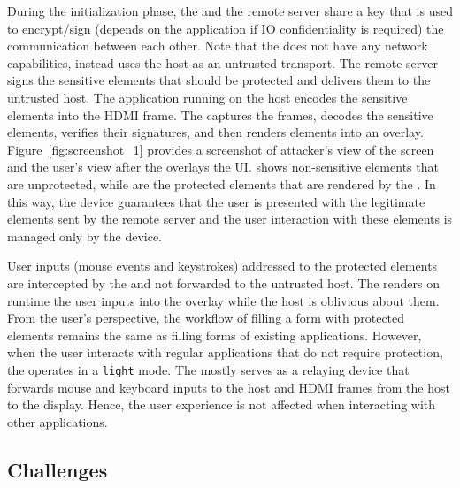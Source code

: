 During the initialization phase, the \device and the remote server share a key that is used to encrypt/sign (depends on the application if IO confidentiality is required) the communication between each other. Note that the \device does not have any network capabilities, instead uses the host as an untrusted transport. The remote server signs the sensitive elements that should be protected and delivers them to the untrusted host. The application running on the host encodes the sensitive elements into the HDMI frame. The \device captures the frames, decodes the sensitive elements, verifies their signatures, and then renders elements into an overlay. Figure~\ref{fig:screenshot_1} provides a screenshot of attacker's view of the screen and the user's view after the \device overlays the UI. \one shows non-sensitive elements that are unprotected, while \two are the protected elements that are rendered by the \device. In this way, the device guarantees that the user is presented with the legitimate elements sent by the remote server and the user interaction with these elements is managed only by the device.
  
User inputs (mouse events and keystrokes) addressed to the protected elements are intercepted by the \device and not forwarded to the untrusted host. The \device renders on runtime the user inputs into the overlay while the host is oblivious about them. From the user's perspective, the workflow of filling a form with protected elements remains the same as filling forms of existing applications. However, when the user interacts with regular applications that do not require \name protection, the \device operates in a \texttt{light} mode. The \device mostly serves as a relaying device that forwards mouse and keyboard inputs to the host and HDMI frames from the host to the display. Hence, the user experience is not affected when interacting with other applications. 

\iffalse
\subsection{Challenges}


